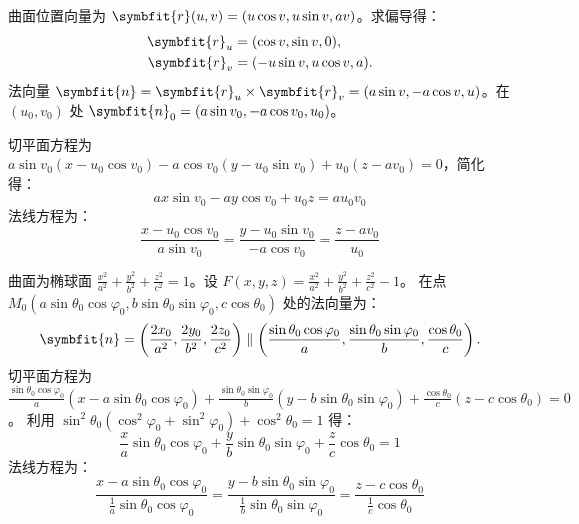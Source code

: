 \begin{solution}
    曲面位置向量为 $\symbfit{r}(u, v) = (u \cos v, u \sin v, av)$。求偏导得：
    \begin{equation}
        \begin{aligned}
            \symbfit{r}_u & = (\cos v, \sin v, 0),      \\
            \symbfit{r}_v & = (-u \sin v, u \cos v, a).
        \end{aligned}
    \end{equation}
    法向量 $\symbfit{n} = \symbfit{r}_u \times \symbfit{r}_v = (a \sin v, -a \cos v, u)$。在 $(u_0, v_0)$ 处 $\symbfit{n}_0 = (a \sin v_0, -a \cos v_0, u_0)$。

    切平面方程为 $a \sin v_0 (x - u_0 \cos v_0) - a \cos v_0 (y - u_0 \sin v_0) + u_0 (z - av_0) = 0$，简化得：
    \begin{equation}
        \boxed{ax \sin v_0 - ay \cos v_0 + u_0 z = a u_0 v_0}
    \end{equation}
    法线方程为：
    \begin{equation}
        \boxed{\frac{x - u_0 \cos v_0}{a \sin v_0} = \frac{y - u_0 \sin v_0}{-a \cos v_0} = \frac{z - av_0}{u_0}}
    \end{equation}

    曲面为椭球面 $\frac{x^2}{a^2} + \frac{y^2}{b^2} + \frac{z^2}{c^2} = 1$。设 $F(x,y,z) = \frac{x^2}{a^2} + \frac{y^2}{b^2} + \frac{z^2}{c^2} - 1$。
    在点 $M_0(a \sin \theta_0 \cos \varphi_0,\allowbreak b \sin \theta_0 \sin \varphi_0,\allowbreak c \cos \theta_0)$ 处的法向量为：
    \begin{equation}
        \symbfit{n} = \left( \frac{2x_0}{a^2}, \frac{2y_0}{b^2}, \frac{2z_0}{c^2} \right) \parallel \left( \frac{\sin \theta_0 \cos \varphi_0}{a}, \frac{\sin \theta_0 \sin \varphi_0}{b}, \frac{\cos \theta_0}{c} \right).
    \end{equation}
    切平面方程为 $\frac{\sin \theta_0 \cos \varphi_0}{a}(x - a \sin \theta_0 \cos \varphi_0) + \frac{\sin \theta_0 \sin \varphi_0}{b}(y - b \sin \theta_0 \sin \varphi_0) + \frac{\cos \theta_0}{c}(z - c \cos \theta_0) = 0$。
    利用 $\sin^2 \theta_0(\cos^2 \varphi_0 + \sin^2 \varphi_0) + \cos^2 \theta_0 = 1$ 得：
    \begin{equation}
        \boxed{\frac{x}{a} \sin \theta_0 \cos \varphi_0 + \frac{y}{b} \sin \theta_0 \sin \varphi_0 + \frac{z}{c} \cos \theta_0 = 1}
    \end{equation}
    法线方程为：
    \begin{equation}
        \boxed{\frac{x - a \sin \theta_0 \cos \varphi_0}{\frac{1}{a} \sin \theta_0 \cos \varphi_0} = \frac{y - b \sin \theta_0 \sin \varphi_0}{\frac{1}{b} \sin \theta_0 \sin \varphi_0} = \frac{z - c \cos \theta_0}{\frac{1}{c} \cos \theta_0}}
    \end{equation}
\end{solution}

